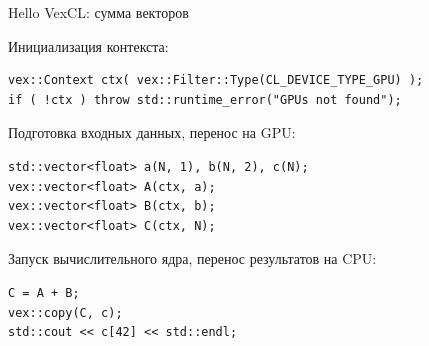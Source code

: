 \documentclass[@BEAMER_OPTIONS@]{beamer}
\begin{document}
\begin{frame}[fragile]{Hello VexCL: сумма векторов}
    \begin{exampleblock}{Инициализация контекста:}
        \begin{lstlisting}
vex::Context ctx( vex::Filter::Type(CL_DEVICE_TYPE_GPU) );
if ( !ctx ) throw std::runtime_error("GPUs not found");
        \end{lstlisting}
    \end{exampleblock}
    \begin{exampleblock}{Подготовка входных данных, перенос на GPU:}
        \begin{lstlisting}[firstnumber=last]
std::vector<float> a(N, 1), b(N, 2), c(N);
vex::vector<float> A(ctx, a);
vex::vector<float> B(ctx, b);
vex::vector<float> C(ctx, N);
        \end{lstlisting}
    \end{exampleblock}
    \begin{exampleblock}{Запуск вычислительного ядра, перенос результатов на
        CPU:}
        \begin{lstlisting}[firstnumber=last]
C = A + B;
vex::copy(C, c);
std::cout << c[42] << std::endl;
        \end{lstlisting}
    \end{exampleblock}
\end{frame}

\end{document}
